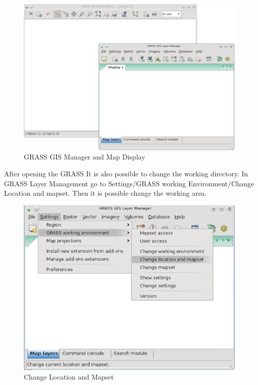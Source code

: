 \begin{figure}[htbp]
   \centering
   \includegraphics[scale=0.3]{gipe007.png}
   \caption{GRASS GIS Manager and Map Display}
   \label{fig:gipe007}
\end{figure}	

After opening the GRASS It is also possible to change the working directory. In GRASS Layer Management go to Settings/GRASS working Environment/Change Location and mapset. Then it is possible change the working area.\newline

\begin{figure}[htbp]
   \centering
   \includegraphics[scale=0.4]{gipe008.png}
   \caption{Change Location and Mapset}
   \label{fig:gipe008}
\end{figure}	

